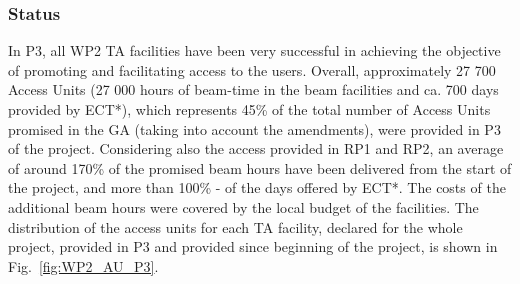 \begin{table}[H]
\end{table}


\subsubsection*{Status}



In P3, all WP2 TA facilities have been very successful in achieving the objective of promoting and facilitating access to the users. Overall, approximately 27 700 Access Units (27 000 hours of beam-time in the beam facilities and ca. 700 days provided by ECT*), which represents  45\% of the total number of Access Units promised in the GA (taking into account the amendments), were provided in P3 of the project. 
Considering also the access provided in RP1 and RP2, 
an average of around 170\% of the promised beam hours have been delivered from the start of the project, and more than 100\% - of the days offered by ECT*. The costs of the additional beam hours were covered by the local budget of the facilities. The distribution of the access units for each TA facility, declared for the whole project, provided in P3 and provided since beginning of the project, is shown in Fig.~\ref{fig:WP2_AU_P3}.


